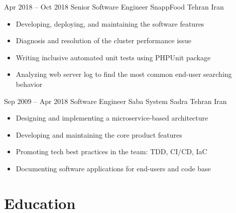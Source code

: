 \documentclass[12pt, a4paper, sans]{moderncv}
\begin{document}
    \cventry
    {Apr 2018 -- Oct 2018}
    {Senior Software Engineer}
    {\newline SnappFood}
    {Tehran}
    {Iran}
    {
        \begin{itemize}
            \item Developing, deploying, and maintaining the software features
            \item Diagnosis and resolution of the cluster performance issue
            \item Writing inclusive automated unit tests using PHPUnit package
            \item Analyzing web server log to find the most common end-user searching behavior
        \end{itemize}
    }

    \cventry
    {Sep 2009 -- Apr 2018}
    {Software Engineer}
    {\newline Saba System Sadra}
    {Tehran}
    {Iran}
    {
        \begin{itemize}
            \item Designing and implementing a microservice-based architecture
            \item Developing and maintaining the core product features
            \item Promoting tech best practices in the team: TDD, CI/CD, IaC
            \item Documenting software applications for end-users and code base
        \end{itemize}
    }


    \section{Education}\label{sec:education}
\end{document}
